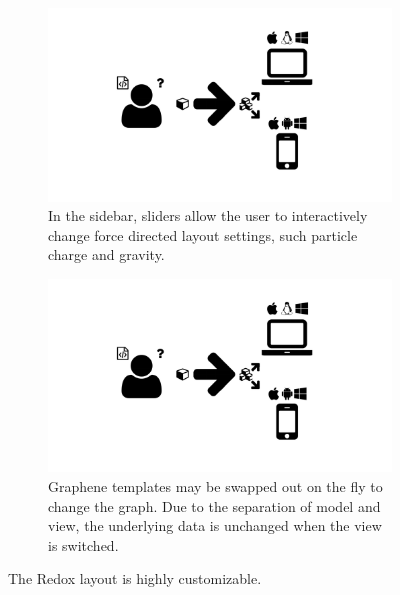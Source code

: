\begin{figure}
  \centering
  \begin{subfigure}[b]{\textwidth}
    \includegraphics[width=\textwidth, page=7,trim=0.37cm 3.65cm 13.1cm 3.3cm, clip=true]{images/Figures.pdf}
    \caption{In the sidebar, sliders allow the user to interactively change force directed layout settings, such particle charge and gravity.}
    \label{Figure:redox-template-a}
  \end{subfigure}
  \begin{subfigure}[b]{\textwidth}
    \includegraphics[width=\textwidth, page=7,trim=13.1cm 3.65cm 0.37cm 3.3cm, clip=true]{images/Figures.pdf}
    \caption{Graphene templates may be swapped out on the fly to change the graph.
      Due to the separation of model and view, the underlying data is unchanged when the view is switched.}
    \label{Figure:redox-template-b}
  \end{subfigure}
  \caption{The Redox layout is highly customizable.}
  \label{Figure:redox-template}
\end{figure}


